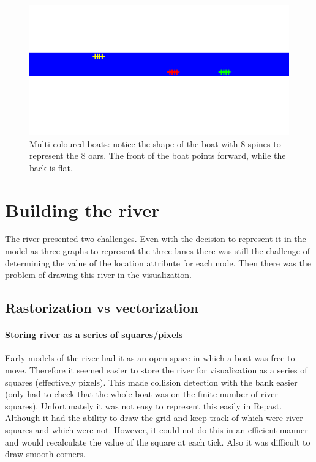       \begin{figure}[h]
      \begin{center}
        \includegraphics[scale=0.3]{images/boats.png}
        \caption{Multi-coloured boats: notice the shape of the boat with 8 spines to represent the 8 oars. The front of the boat points forward, while the back is flat.}
        \label{techissues:fig:boats}
      \end{center}
      \end{figure}
  
  \section{Building the river}\label{techissues:river}
    The river presented two challenges. Even with the decision to represent it in the model as three graphs to represent the three lanes there was still the challenge of determining the value of the location attribute for each node. Then there was the problem of drawing this river in the visualization.
    
    \subsection{Rastorization vs vectorization}
    
      \paragraph{Storing river as a series of squares/pixels}
      Early models of the river had it as an open space in which a boat was free to move. Therefore it seemed easier to store the river for visualization as a series of squares (effectively pixels). This made collision detection with the bank easier (only had to check that the whole boat was on the finite number of river squares). Unfortunately it was not easy to represent this easily in Repast. Although it had the ability to draw the grid and keep track of which were river squares and which were not. However, it could not do this in an efficient manner and would recalculate the value of the square at each tick. Also it was difficult to draw smooth corners.
      

